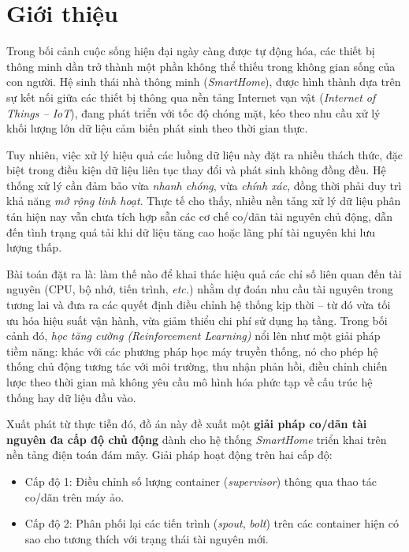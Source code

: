 \section*{Giới thiệu}

Trong bối cảnh cuộc sống hiện đại ngày càng được tự động hóa, các thiết bị thông minh dần trở thành một phần không thể thiếu trong không gian sống của con người. Hệ sinh thái nhà thông minh (\textit{SmartHome}), được hình thành dựa trên sự kết nối giữa các thiết bị thông qua nền tảng Internet vạn vật (\textit{Internet of Things – IoT}), đang phát triển với tốc độ chóng mặt, kéo theo nhu cầu xử lý khối lượng lớn dữ liệu cảm biến phát sinh theo thời gian thực.

Tuy nhiên, việc xử lý hiệu quả các luồng dữ liệu này đặt ra nhiều thách thức, đặc biệt trong điều kiện dữ liệu liên tục thay đổi và phát sinh không đồng đều. Hệ thống xử lý cần đảm bảo vừa \textit{nhanh chóng}, vừa \textit{chính xác}, đồng thời phải duy trì khả năng \textit{mở rộng linh hoạt}. Thực tế cho thấy, nhiều nền tảng xử lý dữ liệu phân tán hiện nay vẫn chưa tích hợp sẵn các cơ chế co/dãn tài nguyên chủ động, dẫn đến tình trạng quá tải khi dữ liệu tăng cao hoặc lãng phí tài nguyên khi lưu lượng thấp.

Bài toán đặt ra là: làm thế nào để khai thác hiệu quả các chỉ số liên quan đến tài nguyên (CPU, bộ nhớ, tiến trình, \textit{etc.}) nhằm dự đoán nhu cầu tài nguyên trong tương lai và đưa ra các quyết định điều chỉnh hệ thống kịp thời – từ đó vừa tối ưu hóa hiệu suất vận hành, vừa giảm thiểu chi phí sử dụng hạ tầng. Trong bối cảnh đó, \textit{học tăng cường (Reinforcement Learning)} nổi lên như một giải pháp tiềm năng: khác với các phương pháp học máy truyền thống, nó cho phép hệ thống chủ động tương tác với môi trường, thu nhận phản hồi, điều chỉnh chiến lược theo thời gian mà không yêu cầu mô hình hóa phức tạp về cấu trúc hệ thống hay dữ liệu đầu vào.

Xuất phát từ thực tiễn đó, đồ án này đề xuất một \textbf{giải pháp co/dãn tài nguyên đa cấp độ chủ động} dành cho hệ thống \textit{SmartHome} triển khai trên nền tảng điện toán đám mây. Giải pháp hoạt động trên hai cấp độ:
\begin{itemize}
    \item Cấp độ 1: Điều chỉnh số lượng container (\textit{supervisor}) thông qua thao tác co/dãn trên máy ảo.
    \item Cấp độ 2: Phân phối lại các tiến trình (\textit{spout}, \textit{bolt}) trên các container hiện có sao cho tương thích với trạng thái tài nguyên mới.
\end{itemize}

